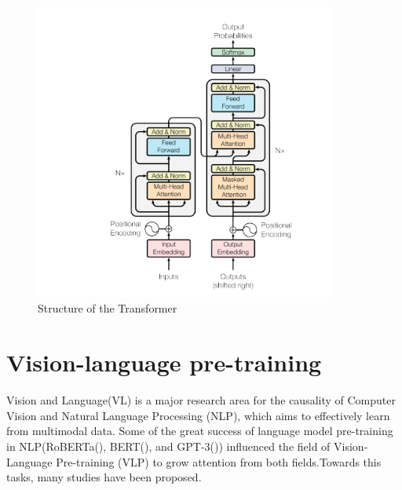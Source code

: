 \begin{figure}[htbp]
    \begin{center}
        \includegraphics[width=10cm]{img/transformer.png}
        \caption{Structure of the Transformer}\label{fig:transformer}
    \end{center}
\end{figure}




\section{Vision-language pre-training}

Vision and Language(VL) is a major research area for the causality of Computer Vision and Natural Language Processing (NLP), which aims to effectively learn from multimodal data. Some of the great success of language model pre-training in NLP(RoBERTa(\cite{liu2020roberta}), BERT(\cite{devlin2018bert}), and GPT-3(\cite{brown2020language})) influenced the field of Vision-Language Pre-training (VLP) to grow attention from both fields.Towards this tasks, many studies have been proposed.


